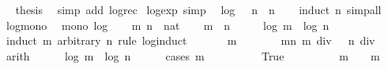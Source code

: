 \begin{isabellebody}
\ \isamarkupfalse%
\ {\isacharquery}thesis\ \isamarkupfalse%
\ {\isacharparenleft}simp\ add{\isacharcolon}\ log{\isacharunderscore}rec{\isacharparenright}\isanewline
{}\isamarkupfalse%
%
\endisatagproof
{\isafoldproof}%
%
\isadelimproof
\isanewline
%
\endisadelimproof
\isanewline
{}\isamarkupfalse%
\ log{\isacharunderscore}exp\ {\isacharbrackleft}simp{\isacharbrackright}{\isacharcolon}\isanewline
\ \ {\isachardoublequoteopen}log\ {\isacharparenleft}{}\ {\isacharcircum}\ n{\isacharparenright}\ {\isacharequal}\ n{\isachardoublequoteclose}\isanewline
%
\isadelimproof
\ \ %
\endisadelimproof
%
\isatagproof
{}\isamarkupfalse%
\ {\isacharparenleft}induct\ n{\isacharparenright}\ simp{\isacharunderscore}all%
\endisatagproof
{\isafoldproof}%
%
\isadelimproof
\isanewline
%
\endisadelimproof
\isanewline
{}\isamarkupfalse%
\ log{\isacharunderscore}mono{\isacharcolon}\isanewline
\ \ {\isachardoublequoteopen}mono\ log{\isachardoublequoteclose}\isanewline
%
\isadelimproof
%
\endisadelimproof
%
\isatagproof
{}\isamarkupfalse%
\isanewline
\ \ \isamarkupfalse%
\ m\ n\ {\isacharcolon}{\isacharcolon}\ nat\isanewline
\ \ \isamarkupfalse%
\ {\isachardoublequoteopen}m\ {\isasymle}\ n{\isachardoublequoteclose}\isanewline
\ \ \isamarkupfalse%
\ \isamarkupfalse%
\ {\isachardoublequoteopen}log\ m\ {\isasymle}\ log\ n{\isachardoublequoteclose}\isanewline
\ \ \isamarkupfalse%
\ {\isacharparenleft}induct\ m\ arbitrary{\isacharcolon}\ n\ rule{\isacharcolon}\ log{\isachardot}induct{\isacharparenright}\isanewline
\ \ \ \ \isamarkupfalse%
\ {\isacharparenleft}{}\ m{\isacharparenright}\isanewline
\ \ \ \ \isamarkupfalse%
\ \isamarkupfalse%
\ mn{}{\isacharcolon}\ {\isachardoublequoteopen}m\ div\ {}\ {\isasymle}\ n\ div\ {}{\isachardoublequoteclose}\ \isamarkupfalse%
\ arith\isanewline
\ \ \ \ \isamarkupfalse%
\ {\isachardoublequoteopen}log\ m\ {\isasymle}\ log\ n{\isachardoublequoteclose}\isanewline
\ \ \ \ \isamarkupfalse%
\ {\isacharparenleft}cases\ {\isachardoublequoteopen}m\ {\isacharless}\ {}{\isachardoublequoteclose}{\isacharparenright}\isanewline
\ \ \ \ \ \ \isamarkupfalse%
\ True\isanewline
\ \ \ \ \ \ \isamarkupfalse%
\ \isamarkupfalse%
\ {\isachardoublequoteopen}m\ {\isacharequal}\ {}\ {\isasymor}\ m\ {\isacharequal}\ {}{\isachardoublequoteclose}\ \isamarkupfalse%

\end{isabellebody}
